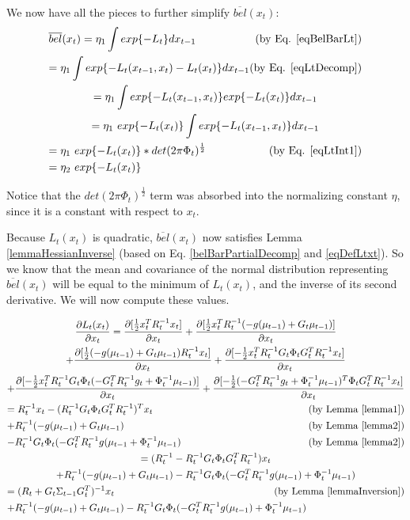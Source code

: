 We now have all the pieces to further simplify \(\overline{bel}(x_t)\):
\begin{multline} \label{belBarPartialDecomp}
\overline{bel}(x_t) = \eta_1 \int exp\{-L_t\}dx_{t-1} \hfill \text{(by Eq. \ref{eqBelBarLt})} \\
= \eta_1 \int exp\{-L_t(x_{t-1},x_t) - L_t(x_t)\}dx_{t-1} \hfill \text{(by Eq. \ref{eqLtDecomp})} \\
= \eta_1 \int exp\{-L_t(x_{t-1},x_t)\} exp \{ - L_t(x_t)\}dx_{t-1} \\
= \eta_1\ exp \{ - L_t(x_t)\} \int exp\{-L_t(x_{t-1},x_t)\} dx_{t-1} \\
= \eta_1\ exp \{ - L_t(x_t)\} * det(2 \pi \Phi_t)^{\frac{1}{2}} \hfill \text{(by Eq. \ref{eqLtInt1})} \\
= \eta_2\ exp \{ - L_t(x_t)\} \hfill
\end{multline}

Notice that the \(det(2 \pi \Phi_t)^{\frac{1}{2}}\) term was absorbed into the normalizing constant \(\eta\), since it is a constant with respect to \(x_t\).

Because \(L_t(x_t)\) is quadratic, \(\overline{bel}(x_t)\) now satisfies Lemma \ref{lemmaHessianInverse} (based on Eq. \ref{belBarPartialDecomp} and \ref{eqDefLtxt}). So we know that the mean and covariance of the normal distribution representing \(\overline{bel}(x_t)\) will be equal to the minimum of \(L_t(x_t)\), and the inverse of its second derivative. We will now compute these values.

\begin{multline*}
\frac{\partial L_t(x_t)}{\partial x_t} = \frac{\partial [\frac{1}{2} x_t^T R_t^{-1}x_t]}{\partial x_t} + \frac{\partial [\frac{1}{2} x_t^TR_t^{-1}(-g(\mu_{t-1})+G_t\mu_{t-1})]}{\partial x_t} \\
+ \frac{\partial [\frac{1}{2} (-g(\mu_{t-1})+G_t\mu_{t-1})R_t^{-1}x_t]}{\partial x_t} + \frac{\partial [-\frac{1}{2} x_t^TR_t^{-1}G_t\Phi_tG_t^TR_t^{-1}x_t]}{\partial x_t} \\
+ \frac{\partial [-\frac{1}{2} x_t^TR_t^{-1}G_t\Phi_t(-G_t^TR_t^{-1}g_t + \Phi_t^{-1}\mu_{t-1})]}{\partial x_t} + \frac{\partial [-\frac{1}{2} (-G_t^TR_t^{-1}g_t + \Phi_t^{-1}\mu_{t-1})^T\Phi_tG_t^TR_t^{-1}x_t]}{\partial x_t} \\
= R_t^{-1}x_t - (R_t^{-1}G_t\Phi_tG_t^TR_t^{-1})^Tx_t  \hfill \text{(by Lemma \ref{lemma1})} \\
+ R_t^{-1}(-g(\mu_{t-1}) + G_t\mu_{t-1}) \hfill \text{(by Lemma \ref{lemma2})} \\
-R_t^{-1}G_t\Phi_t(-G_t^TR_t^{-1}g(\mu_{t-1} + \Phi_t^{-1}\mu_{t-1}) \hfill \text{(by Lemma \ref{lemma2})} \\
= (R_t^{-1} - R_t^{-1}G_t\Phi_tG_t^TR_t^{-1})x_t \\
+ R_t^{-1}(-g(\mu_{t-1}) + G_t\mu_{t-1}) - R_t^{-1}G_t\Phi_t(-G_t^TR_t^{-1}g(\mu_{t-1}) + \Phi_t^{-1}\mu_{t-1}) \\
= (R_t + G_t\Sigma_{t-1}G_t^T)^{-1}x_t \hfill \text{(by Lemma \ref{lemmaInversion})} \\
+ R_t^{-1}(-g(\mu_{t-1}) + G_t\mu_{t-1}) - R_t^{-1}G_t\Phi_t(-G_t^TR_t^{-1}g(\mu_{t-1}) + \Phi_t^{-1}\mu_{t-1}) \hfill
\end{multline*}

